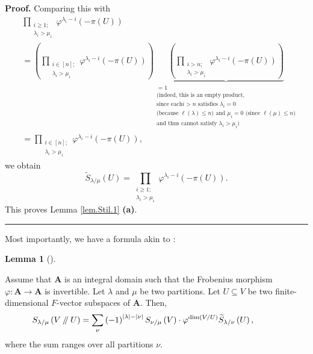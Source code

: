 \documentclass[numbers=enddot,12pt,final,onecolumn,notitlepage]{scrartcl}%
\numberwithin{exer}{section}
\theoremstyle{definition}
\newtheorem{lem}[theo]{Lemma}
\newenvironment{lemma}[1][]
{\begin{lem}[#1]\begin{leftbar}}
{\end{leftbar}\end{lem}}
\newenvironment{proof}[1][Proof]{\noindent\textbf{#1.} }{\ \rule{0.5em}{0.5em}}
\let\sumnonlimits\sum
\let\prodnonlimits\prod
\renewcommand{\sum}{\sumnonlimits\limits}
\renewcommand{\prod}{\prodnonlimits\limits}
\newcommand{\sslash}{\mathbin{/\mkern-5mu/}}
\theoremstyle{plainsl}
\begin{document}
\begin{proof}
Comparing this with%
\begin{align*}
&  \prod_{\substack{i\geq1;\\\lambda_{i}>\mu_{i}}}\varphi^{\lambda_{i}%
-i}\left(  -\pi\left(  U\right)  \right) \\
&  =\left(  \prod_{\substack{i\in\left[  n\right]  ;\\\lambda_{i}>\mu_{i}%
}}\varphi^{\lambda_{i}-i}\left(  -\pi\left(  U\right)  \right)  \right)
\underbrace{\left(  \prod_{\substack{i>n;\\\lambda_{i}>\mu_{i}}}\varphi
^{\lambda_{i}-i}\left(  -\pi\left(  U\right)  \right)  \right)  }%
_{\substack{=1\\\text{(indeed, this is an empty product,}\\\text{since each
}i>n\text{ satisfies }\lambda_{i}=0\\\text{(because }\ell\left(
\lambda\right)  \leq n\text{) and }\mu_{i}=0\text{ (since }\ell\left(
\mu\right)  \leq n\text{)}\\\text{and thus cannot satisfy }\lambda_{i}>\mu
_{i}\text{)}}}\\
&  =\prod_{\substack{i\in\left[  n\right]  ;\\\lambda_{i}>\mu_{i}}%
}\varphi^{\lambda_{i}-i}\left(  -\pi\left(  U\right)  \right)  ,
\end{align*}
we obtain%
\[
\widetilde{S}_{\lambda/\mu}\left(  U\right)  =\prod_{\substack{i\geq
1;\\\lambda_{i}>\mu_{i}}}\varphi^{\lambda_{i}-i}\left(  -\pi\left(  U\right)
\right)  .
\]
This proves Lemma \ref{lem.Stil.1} \textbf{(a)}.
\end{proof}

Most importantly, we have a formula akin to \cite[(7.18)]{Macdon92}:

\begin{lemma}
\label{lem.Stilde.coproduct}Assume that $\mathbf{A}$ is an integral domain
such that the Frobenius morphism $\varphi:\mathbf{A}\rightarrow\mathbf{A}$ is
invertible. Let $\lambda$ and $\mu$ be two partitions. Let $U\subseteq V$ be
two finite-dimensional $F$-vector subspaces of $\mathbf{A}$. Then,%
\begin{equation}
S_{\lambda/\mu}\left(  V\sslash U\right)  =\sum_{\nu}\left(  -1\right)
^{\left\vert \lambda\right\vert -\left\vert \nu\right\vert }S_{\nu/\mu}\left(
V\right)  \cdot\varphi^{\dim\left(  V/U\right)  }\widetilde{S}_{\lambda/\nu
}\left(  U\right)  ,\ \ \ \ \ \ \ \ \ \ \label{eq.Stilde.coproduct}%
\end{equation}
where the sum ranges over all partitions $\nu$.
\end{lemma}
\end{document}
